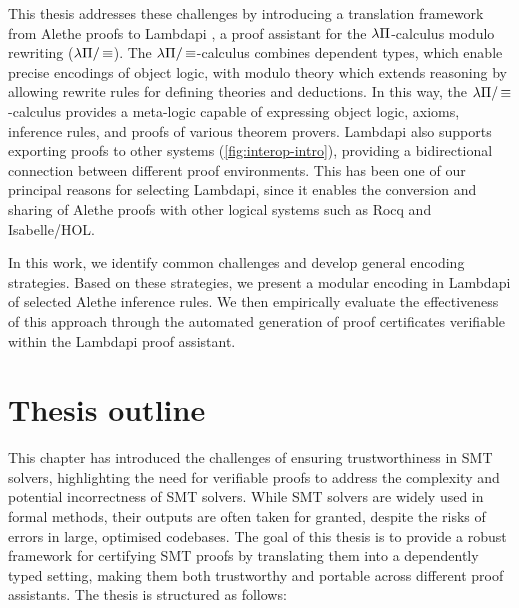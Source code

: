 This thesis addresses these challenges by introducing a translation framework from Alethe proofs to Lambdapi \cite{lambdapi}, a proof assistant for the $\lambda\Pi$-calculus modulo rewriting ($\lambda\Pi/\mathop{\equiv}$).
The $\lambda\Pi/\mathop{\equiv}$-calculus combines dependent types, which enable precise encodings of object logic, with modulo theory which extends reasoning by allowing rewrite rules for defining theories and deductions.
In this way, the $\lambda\Pi/\mathop{\equiv}$-calculus provides a meta-logic capable of expressing object logic, axioms, inference rules, and proofs of various theorem provers.
Lambdapi also supports exporting proofs to other systems (\cref{fig:interop-intro}), providing a bidirectional connection between different proof environments.
This has been one of our principal reasons for selecting Lambdapi, since it enables the conversion and sharing of Alethe proofs with other logical systems such as Rocq and Isabelle/HOL.

In this work, we identify common challenges and develop general encoding strategies.
Based on these strategies, we present a modular encoding in Lambdapi of selected Alethe inference rules.
We then empirically evaluate the effectiveness of this approach through the automated generation of proof certificates verifiable within the Lambdapi proof assistant.

\section{Thesis outline}
\label{sec:thesis-outline}

This chapter has introduced the challenges of ensuring trustworthiness in SMT solvers, highlighting the need for verifiable proofs to address the complexity and potential incorrectness of SMT solvers.
While SMT solvers are widely used in formal methods, their outputs are often taken for granted, despite the risks of errors in large, optimised codebases.
The goal of this thesis is to provide a robust framework for certifying SMT proofs by translating them into a dependently typed setting, making them both trustworthy and portable across different proof assistants.
The thesis is structured as follows:

